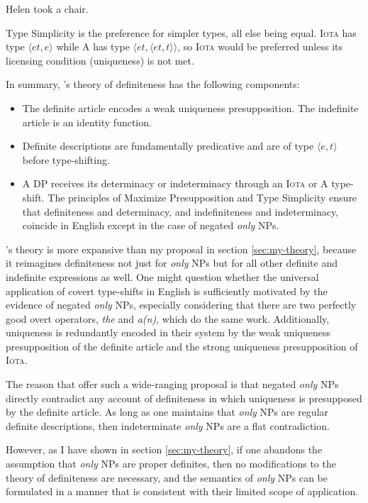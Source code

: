 \begin{exe}
	\ex \label{helen} Helen took a chair.
\end{exe}

Type Simplicity is the preference for simpler types, all else being equal. \textsc{Iota} has type $\langle et, e \rangle$ while \textsc{A} has type $\langle et, \langle et, t \rangle \rangle$, so \textsc{Iota} would be preferred unless its licensing condition (uniqueness) is not met.

In summary, \citeauthor{cb2015}'s theory of definiteness has the following components:

\begin{itemize}
	\item The definite article encodes a weak uniqueness presupposition. The indefinite article is an identity function.
	\item Definite descriptions are fundamentally predicative and are of type $\langle e, t \rangle$ before type-shifting.
	\item A DP receives its determinacy or indeterminacy through an \textsc{Iota} or \textsc{A} type-shift. The principles of Maximize Presupposition and Type Simplicity ensure that definiteness and determinacy, and indefiniteness and indeterminacy, coincide in English except in the case of negated \textit{only} NPs.
\end{itemize}

\citeauthor{cb2015}'s theory is more expansive than my proposal in section \ref{sec:my-theory}, because it reimagines definiteness not just for \textit{only} NPs but for all other definite and indefinite expressions as well. One might question whether the universal application of covert type-shifts in English is sufficiently motivated by the evidence of negated \textit{only} NPs, especially considering that there are two perfectly good overt operators, \textit{the} and \textit{a(n)}, which do the same work. Additionally, uniqueness is redundantly encoded in their system by the weak uniqueness presupposition of the definite article and the strong uniqueness presupposition of \textsc{Iota}.

The reason that \citeauthor{cb2015} offer such a wide-ranging proposal is that negated \textit{only} NPs directly contradict any account of definiteness in which uniqueness is presupposed by the definite article. As long as one maintains that \textit{only} NPs are regular definite descriptions, then indeterminate \textit{only} NPs are a flat contradiction.

However, as I have shown in section \ref{sec:my-theory}, if one abandons the assumption that \textit{only} NPs are proper definites, then no modifications to the theory of definiteness are necessary, and the semantics of \textit{only} NPs can be formulated in a manner that is consistent with their limited scope of application.